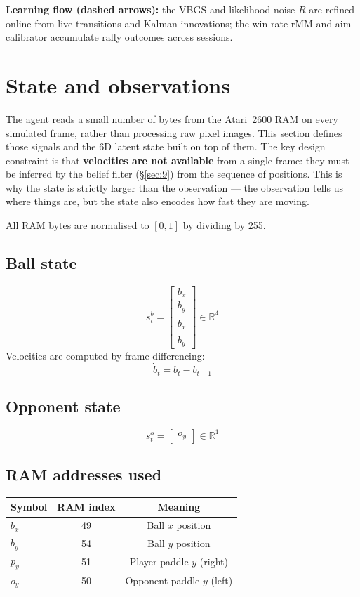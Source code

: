 \documentclass[12pt, a4paper]{article}
\newcommand{\R}{\mathbb{R}}
\newcommand{\1}{\mathbf{1}}
\begin{document}
\textbf{Learning flow (dashed arrows):} the VBGS and likelihood noise $R$ are
refined online from live transitions and Kalman innovations; the win-rate rMM
and aim calibrator accumulate rally outcomes across sessions.

\section{State and observations}
\label{sec:1}

The agent reads a small number of bytes from the Atari~2600 RAM on every simulated
frame, rather than processing raw pixel images.  This section defines those signals
and the 6D latent state built on top of them.  The key design constraint is that
\textbf{velocities are not available} from a single frame: they must be inferred by
the belief filter (\S\ref{sec:9}) from the sequence of positions.  This is why the
state is strictly larger than the observation --- the observation tells us where
things are, but the state also encodes how fast they are moving.

All RAM bytes are normalised to $[0,1]$ by dividing by 255.

\subsection{Ball state}
\[
s^b_t = \begin{bmatrix} b_x \\ b_y \\ \dot b_x \\ \dot b_y \end{bmatrix} \in \R^4
\]
Velocities are computed by frame differencing:
\[
\dot b_t = b_t - b_{t-1}
\]

\subsection{Opponent state}
\[
s^o_t = \begin{bmatrix} o_y \end{bmatrix} \in \R^1
\]

\subsection{RAM addresses used}

\begin{table}[ht]
\centering
\begin{tabular}{lcc}
\toprule
Symbol & RAM index & Meaning \\
\midrule
$b_x$ & 49 & Ball $x$ position \\
$b_y$ & 54 & Ball $y$ position \\
$p_y$ & 51 & Player paddle $y$ (right) \\
$o_y$ & 50 & Opponent paddle $y$ (left) \\
\bottomrule
\end{tabular}
\end{table}
\end{document}
